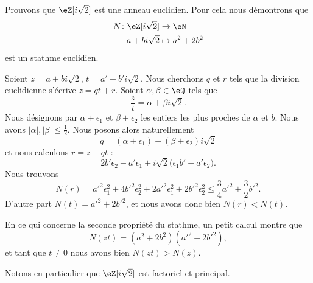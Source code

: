 \begin{example} \label{ExeDufyZI}
    Prouvons que \( \eZ[i\sqrt{2}]\) est une anneau euclidien. Pour cela nous démontrons que
    \begin{equation}    \label{EqOZUIooZGmHWl}
        \begin{aligned}
            N\colon \eZ[i\sqrt{2}]&\to \eN \\
            a+bi\sqrt{2}&\mapsto a^2+2b^2 
        \end{aligned}
    \end{equation}
    est un stathme euclidien.    

    Soient \( z=a+bi\sqrt{2}\), \( t=a'+b'i\sqrt{2}\). Nous cherchons \( q\) et \( r\) tels que la division euclidienne s'écrive \( z=qt+r\). Soient \( \alpha,\beta\in \eQ\) tels que 
    \begin{equation}
        \frac{ z }{ t }=\alpha+\beta i\sqrt{2}.
    \end{equation}
    Nous désignons par \( \alpha+\epsilon_1\) et \( \beta+\epsilon_2\) les entiers les plus proches de \( \alpha\) et \( b\). Nous avons \( | \alpha |,| \beta |\leq \frac{ 1 }{2}\). Nous posons alors naturellement 
    \begin{equation}
        q=(\alpha+\epsilon_1)+(\beta+\epsilon_2)i\sqrt{2}
    \end{equation}
    et nous calculons \( r=z-qt\) :
    \begin{equation}
        2b'\epsilon_2-a'\epsilon_1+i\sqrt{2}\big( \epsilon_1b'-a'\epsilon_2 \big).
    \end{equation}
    Nous trouvons 
    \begin{equation}
        N(r)=a'^2\epsilon_1^2+4b'^2\epsilon_2^2+2a'^2\epsilon_1^2+2b'^2\epsilon_2^2\leq \frac{ 3 }{ 4 }a'^2+\frac{ 3 }{2}b'^2.
    \end{equation}
    D'autre part \( N(t)=a'^2+2b'^2\), et nous avons donc bien \( N(r)<N(t)\).

    En ce qui concerne la seconde propriété du stathme, un petit calcul montre que
    \begin{equation}
        N(zt)=(a^2+2b^2)(a'^2+2b'^2),
    \end{equation}
    et tant que \( t\neq 0\) nous avons bien \( N(zt)>N(z)\).
\end{example}

Notons en particulier que \( \eZ[i\sqrt{2}]\) est factoriel et principal.

